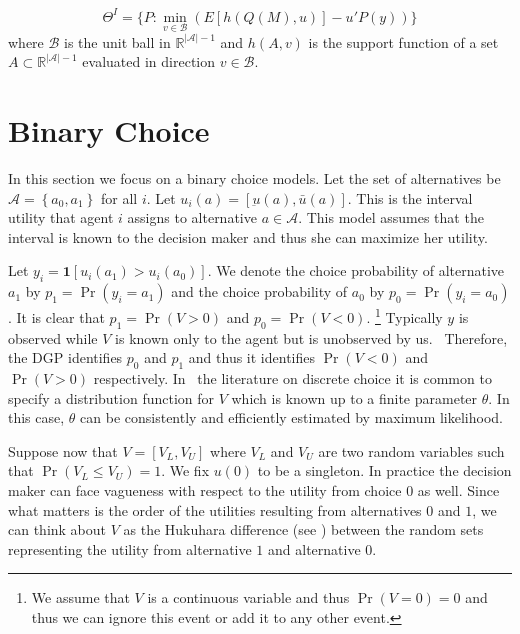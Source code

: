 \documentclass[reqno]{article}
\renewcommand{\cite}{\citet}
\begin{document}
\begin{equation}
    \Theta^I = \{ P : \min_{v \in \mathcal{B}}(E[h(Q(M),u)] - u'P(y)) \}
\end{equation}
where $\mathcal{B}$ is the unit ball in $\mathbb{R}^{| \mathcal{A} | - 1}$ and $h(A,v)$ is the support function of a set $A \subset \mathbb{R}^{| \mathcal{A} | - 1}$ evaluated in direction $v \in \mathcal{B}$.
\section{Binary Choice}
\label{BinaryChoice}

In this section we focus on a binary choice models. Let the set of alternatives be $\mathcal{A}=\left\{ a_0,a_1\right\} $ for all $i$. Let $u_{i}(a) = [\underbar{u}(a) , \bar{u} (a) ] $. This is the interval utility that agent $i$ assigns to alternative $a \in \mathcal{A}$. This model assumes that the interval is known to the decision maker and thus she can maximize her utility.

Let $y_{i}=\mathbf{1}\left[ u_i(a_1)>u_i(a_0)\right]$. We denote the choice probability of alternative $a_1$ by $p_1 = \Pr \left( y_{i}=a_1\right)$ and the choice probability of $a_0$ by $p_0=\Pr \left( y_{i}=a_0\right)$. It is clear that $p_{1}=\Pr \left( V>0\right) $ and $p_{0}=\Pr \left( V<0\right) $.%
\footnote{We assume that $V$ is a continuous variable and thus $\Pr \left( V=0\right)
=0$ and thus we can ignore this event or add it to any other event.}
Typically $y$ is observed while $V$ is known only to the agent but is unobserved by us. \ Therefore, the DGP identifies $p_{0}$ and $p_{1}$ and thus it identifies $\Pr \left( V<0\right) $ and $\Pr \left( V>0\right) $
respectively. In \ the literature on discrete choice it is common to specify a distribution function for $V$ which is known up to a finite parameter $\theta $. In this case, $\theta $ can be consistently and efficiently
estimated by maximum likelihood.

Suppose now that $V=[V_{L},V_{U}]$ where $V_{L}$ and $V_{U}$ are two random variables such that $\Pr \left( V_{L}\leq V_{U}\right) =1$. We fix $u\left(0\right) $ to be a singleton. In practice the decision maker can face
vagueness with respect to the utility from choice $0$ as well. Since what matters is the order of the utilities resulting from alternatives $0$ and $1$, we can think about $V$ as the Hukuhara difference (see \cite{Hukuhara1967}%
) between the random sets representing the utility from alternative $1$ and alternative $0$.
\end{document}
